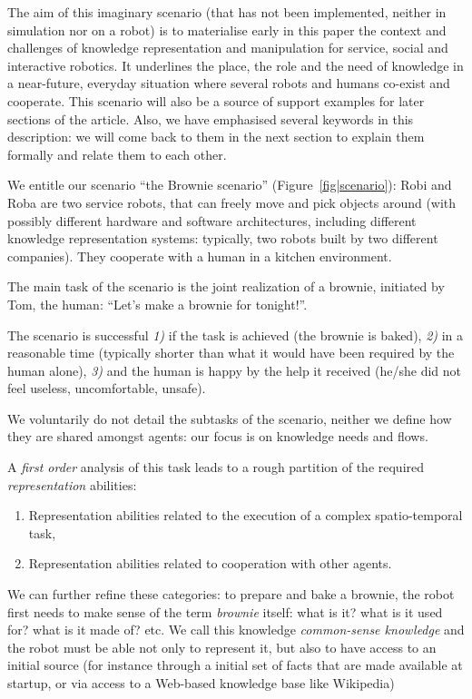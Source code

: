 \documentclass[a4paper, twocolumn]{article}
\begin{document}
The aim of this imaginary scenario (that has not been implemented, neither in
simulation nor on a robot) is to materialise early in this paper the context
and challenges of knowledge representation and manipulation for service, social
and interactive robotics. It underlines the place, the role and the need of
knowledge in a near-future, everyday situation where several robots and humans
co-exist and cooperate. This scenario will also be a source of support examples
for later sections of the article. Also, we have emphasised several keywords in
this description: we will come back to them in the next section to
explain them formally and relate them to each other.

We entitle our scenario ``the Brownie scenario'' (Figure~\ref{fig|scenario}):
Robi and Roba are two service robots, that can freely move and pick objects
around (with possibly different hardware and software architectures, including
different knowledge representation systems: typically, two robots built by two
different companies). They cooperate with a human in a kitchen environment.

The main task of the scenario is the joint realization of a brownie, initiated
by Tom, the human: ``Let's make a brownie for tonight!''.

The scenario is successful {\it 1)} if the task is achieved (the brownie is baked),
{\it 2)} in a reasonable time (typically shorter than what it would have been
required by the human alone), {\it 3)} and the human is happy by the help it received
(he/she did not feel useless, uncomfortable, unsafe).

We voluntarily do not detail the subtasks of the scenario, neither we define
how they are shared amongst agents: our focus is on knowledge needs and flows.

A \textit{first order} analysis of this task leads to a rough partition of the
required \emph{representation} abilities:

\begin{enumerate}

	\item Representation abilities related to the execution of a complex
	spatio-temporal task,

	\item Representation abilities related to cooperation with other agents.

\end{enumerate}

We can further refine these categories: to prepare and bake a brownie, the
robot first needs to make sense of the term \emph{brownie} itself: what is it?
what is it used for? what is it made of? etc. We call this knowledge
\emph{common-sense knowledge} and the robot must be able not only to represent
it, but also to have access to an initial source (for instance through a
initial set of facts that are made available at startup, or via access to a
Web-based knowledge base like Wikipedia)
\end{document}
